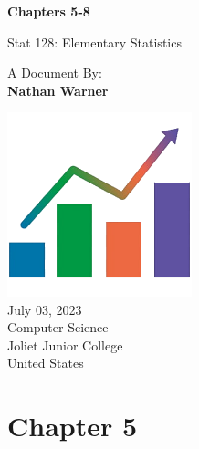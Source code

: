 \documentclass{report}
\title{\Huge{}}
\author{\huge{Nathan Warner}}
\date{\huge{}}
\begin{document}
        \begin{titlepage}
       \begin{center}
           \vspace*{1cm}
    
           \textbf{Chapters 5-8}
    
           \vspace{0.5cm}
           Stat 128: Elementary Statistics
            
                
           \vspace{1.5cm}
   
           A Document By: \\
           \textbf{Nathan Warner}
    
           \vfill
                
                
           \vspace{0.8cm}
         
           \includegraphics[width=0.4\textwidth]{../1-4/figures/2.png} \\
            July 03, 2023  \\
           Computer Science \\
           Joliet Junior College \\
           United States\\
           
                
       \end{center}
    \end{titlepage}
    \tableofcontents
    \pagebreak \bigbreak \noindent
    \section{Chapter 5}
    \bigbreak \noindent 
\end{document}
